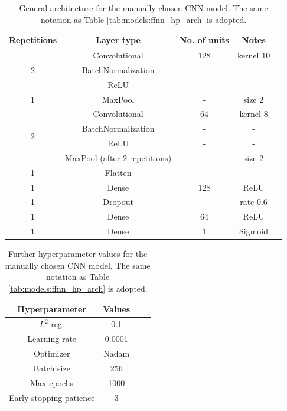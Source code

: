 \documentclass{article}
\begin{document}
\begin{table}
    \centering
    \begin{tabular}{ccccc}
        \toprule
        Repetitions & Layer type & No. of units & Notes \\
        \midrule
        \multirow{3}{*}{2} & Convolutional & 128 & kernel 10 \\
        & BatchNormalization & - & - \\
        & ReLU & - & - \\\hline
        1 & MaxPool & - & size 2 \\\hline
        \multirow{4}{*}{2} & Convolutional & 64 & kernel 8 \\
        & BatchNormalization & - & - \\
        & ReLU & - & - \\
        & MaxPool (after 2 repetitions) & - & size 2 \\\hline
        1 & Flatten & - & - \\\hline
        1 & Dense & 128 & ReLU \\\hline
        1 & Dropout & - & rate 0.6 \\\hline
        1 & Dense & 64 & ReLU \\\hline
        1 & Dense & 1 & Sigmoid \\
        \bottomrule
    \end{tabular}
    \caption{General architecture for the manually chosen CNN model. The same notation as Table \ref{tab:models:ffnn_hp_arch} is adopted.}
    \label{tab:models:cnn_manual_arch}
\end{table}

\begin{table}
    \centering
    \begin{tabular}{cccc}
        \toprule
        Hyperparameter & Values \\
        \midrule
        $L^2$ reg. & 0.1 \\
        Learning rate & 0.0001 \\
        Optimizer & Nadam \\
        Batch size & 256 \\
        Max epochs & 1000 \\
        Early stopping patience & 3 \\
        \bottomrule
    \end{tabular}
    \caption{Further hyperparameter values for the manually chosen CNN model. The same notation as Table \ref{tab:models:ffnn_hp_arch} is adopted.}
    \label{tab:models:cnn_manual_hps}
\end{table}
\end{document}
